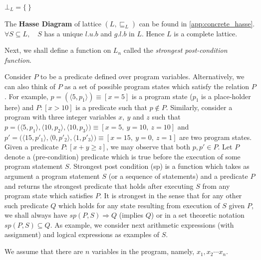 \documentclass[final,3p, review, times]{Elsevier/elsarticle}
\begin{document}
$\bot_L=\big\{\ \big\}$

The \textbf{Hasse Diagram} of lattice $(L,\sqsubseteq_L)$ can be found in \ref{app:concrete_hasse}. $\forall S\subseteq L,\quad S$ has a unique $l.u.b$ and $g.l.b$ in $L$. Hence $L$ is a complete lattice.

Next, we shall define a function on $L_n$ called the \textit{strongest post-condition function}\cite{lara13}.

Consider $P$ to be a predicate defined over program variables. Alternatively, we can also think of $P$ as a set of possible program states which satisfy the relation $P$. For example, $p=(\langle5,p_1\rangle)\equiv[x=5]$ is a program state ($p_1$ is a place-holder here) and $P:[x>10]$ is a predicate such that $p\notin P$. Similarly, consider a program with three integer variables $x,\ y$ and $z$ such that $p=\big(\langle5,p_1\rangle,\langle10,p_2\rangle,\langle10,p_3\rangle\big)\equiv[x=5,\ y=10,\ z=10]$ and $p'=\big(\langle15,p'_1\rangle,\langle0,p'_2\rangle,\langle1,p'_3\rangle\big)\equiv[x=15,\ y=0,\ z=1]$ are two program states. Given a predicate $P:[x+y\geq z]$, we may observe that both $p,p'\in P$. Let $P$ denote a (pre-condition) predicate which is true before the execution of some program statement $S$. Strongest post condition (sp) is a function which takes as argument a program statement $S$ (or a sequence of statements) and a predicate $P$ and returns the strongest predicate that holds after executing $S$ from any program state which satisfies $P$. It is strongest in the sense that for any other such predicate $Q$ which holds for any state resulting from execution of $S$ given $P$, we shall always have $sp(P,S)\Rightarrow Q$ (implies $Q$) or in a set theoretic notation $sp(P,S)\subseteq Q$. As example, we consider next arithmetic expressions (with assignment) and logical expressions as examples of $S$.

We assume that there are $n$ variables in the program, namely, $x_1,x_2\cdots x_n$.
\end{document}
